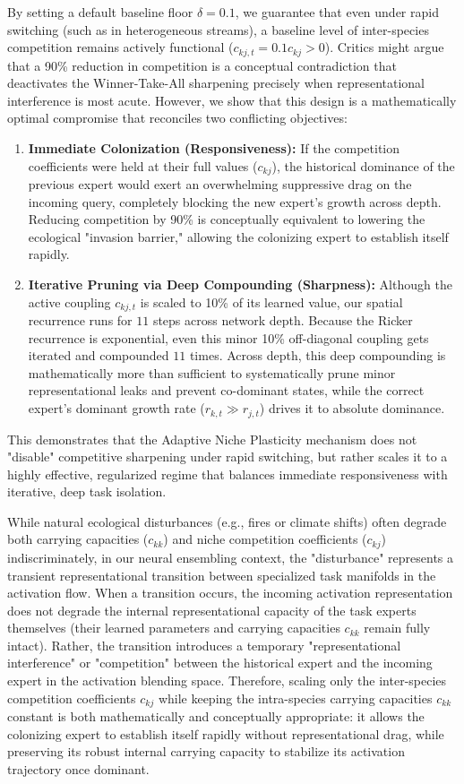 By setting a default baseline floor $\delta = 0.1$, we guarantee that even under rapid switching (such as in heterogeneous streams), a baseline level of inter-species competition remains actively functional ($c_{kj, t} = 0.1 c_{kj} > 0$). Critics might argue that a 90\% reduction in competition is a conceptual contradiction that deactivates the Winner-Take-All sharpening precisely when representational interference is most acute. However, we show that this design is a mathematically optimal compromise that reconciles two conflicting objectives:
\begin{enumerate}
    \item \textbf{Immediate Colonization (Responsiveness):} If the competition coefficients were held at their full values ($c_{kj}$), the historical dominance of the previous expert would exert an overwhelming suppressive drag on the incoming query, completely blocking the new expert's growth across depth. Reducing competition by 90\% is conceptually equivalent to lowering the ecological "invasion barrier," allowing the colonizing expert to establish itself rapidly.
    \item \textbf{Iterative Pruning via Deep Compounding (Sharpness):} Although the active coupling $c_{kj, t}$ is scaled to 10\% of its learned value, our spatial recurrence runs for $11$ steps across network depth. Because the Ricker recurrence is exponential, even this minor 10\% off-diagonal coupling gets iterated and compounded $11$ times. Across depth, this deep compounding is mathematically more than sufficient to systematically prune minor representational leaks and prevent co-dominant states, while the correct expert's dominant growth rate ($r_{k, t} \gg r_{j, t}$) drives it to absolute dominance.
\end{enumerate}
This demonstrates that the Adaptive Niche Plasticity mechanism does not "disable" competitive sharpening under rapid switching, but rather scales it to a highly effective, regularized regime that balances immediate responsiveness with iterative, deep task isolation.

While natural ecological disturbances (e.g., fires or climate shifts) often degrade both carrying capacities ($c_{kk}$) and niche competition coefficients ($c_{kj}$) indiscriminately, in our neural ensembling context, the "disturbance" represents a transient representational transition between specialized task manifolds in the activation flow. When a transition occurs, the incoming activation representation does not degrade the internal representational capacity of the task experts themselves (their learned parameters and carrying capacities $c_{kk}$ remain fully intact). Rather, the transition introduces a temporary "representational interference" or "competition" between the historical expert and the incoming expert in the activation blending space. Therefore, scaling only the inter-species competition coefficients $c_{kj}$ while keeping the intra-species carrying capacities $c_{kk}$ constant is both mathematically and conceptually appropriate: it allows the colonizing expert to establish itself rapidly without representational drag, while preserving its robust internal carrying capacity to stabilize its activation trajectory once dominant.

